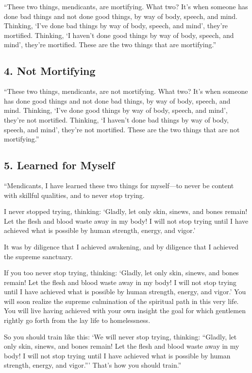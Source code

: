 \documentclass[12pt,openany]{book}%
\begin{document}
“These two things, mendicants, are mortifying. What two? It’s when someone has done bad things and not done good things, by way of body, speech, and mind. Thinking, ‘I’ve done bad things by way of body, speech, and mind’, they’re mortified. Thinking, ‘I haven’t done good things by way of body, speech, and mind’, they’re mortified. These are the two things that are mortifying.” 

\subsection*{4. Not Mortifying }

“These two things, mendicants, are not mortifying. What two? It’s when someone has done good things and not done bad things, by way of body, speech, and mind. Thinking, ‘I’ve done good things by way of body, speech, and mind’, they’re not mortified. Thinking, ‘I haven’t done bad things by way of body, speech, and mind’, they’re not mortified. These are the two things that are not mortifying.” 

\subsection*{5. Learned for Myself }

“Mendicants, I have learned these two things for myself—to never be content with skillful qualities, and to never stop trying. 

I never stopped trying, thinking: ‘Gladly, let only skin, sinews, and bones remain! Let the flesh and blood waste away in my body! I will not stop trying until I have achieved what is possible by human strength, energy, and vigor.’ 

It was by diligence that I achieved awakening, and by diligence that I achieved the supreme sanctuary. 

If you too never stop trying, thinking: ‘Gladly, let only skin, sinews, and bones remain! Let the flesh and blood waste away in my body! I will not stop trying until I have achieved what is possible by human strength, energy, and vigor.’ You will soon realize the supreme culmination of the spiritual path in this very life. You will live having achieved with your own insight the goal for which gentlemen rightly go forth from the lay life to homelessness. 

So you should train like this: ‘We will never stop trying, thinking: “Gladly, let only skin, sinews, and bones remain! Let the flesh and blood waste away in my body! I will not stop trying until I have achieved what is possible by human strength, energy, and vigor.”’ That’s how you should train.” 
\end{document}
